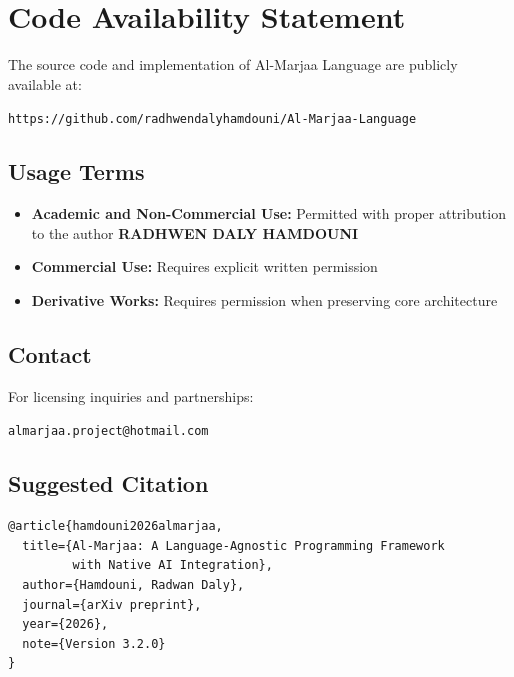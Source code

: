 \documentclass[11pt,a4paper]{article}
\begin{document}
\section{Code Availability Statement}
\label{sec:availability}

The source code and implementation of Al-Marjaa Language are publicly available at:

\begin{center}
\texttt{https://github.com/radhwendalyhamdouni/Al-Marjaa-Language}
\end{center}

\subsection{Usage Terms}

\begin{itemize}
    \item \textbf{Academic and Non-Commercial Use:} Permitted with proper attribution to the author \textbf{RADHWEN DALY HAMDOUNI}
    \item \textbf{Commercial Use:} Requires explicit written permission
    \item \textbf{Derivative Works:} Requires permission when preserving core architecture
\end{itemize}

\subsection{Contact}

For licensing inquiries and partnerships:
\begin{center}
\texttt{almarjaa.project@hotmail.com}
\end{center}

\subsection{Suggested Citation}

\begin{lstlisting}[language={},title={BibTeX Citation}]
@article{hamdouni2026almarjaa,
  title={Al-Marjaa: A Language-Agnostic Programming Framework 
         with Native AI Integration},
  author={Hamdouni, Radwan Daly},
  journal={arXiv preprint},
  year={2026},
  note={Version 3.2.0}
}
\end{lstlisting}
\end{document}
